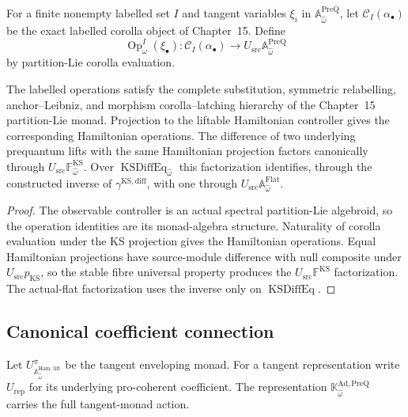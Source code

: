 \begin{construction}
\label{constr:prequantum-exact-labelled-observable-operations}
For a finite nonempty labelled set $I$ and tangent variables $\xi_i$ in
$\mathbb A_{\widehat\omega}^{\mathrm{PreQ}}$, let
$\mathcal C_I(\alpha_\bullet)$ be the exact labelled corolla object of Chapter~15.
Define
\[
\boxed{
\operatorname{Op}^{I}_{\widehat\omega}(\xi_\bullet):
\mathcal C_I(\alpha_\bullet)
\longrightarrow
U_{\mathrm{src}}\mathbb A_{\widehat\omega}^{\mathrm{PreQ}}
}
\]
by partition-Lie corolla evaluation.
\end{construction}

\begin{theorem}
\label{thm:prequantum-complete-higher-observable-coherence}
The labelled operations satisfy the complete substitution, symmetric relabelling,
anchor--Leibniz, and morphism corolla--latching hierarchy of the Chapter~15
partition-Lie monad.  Projection to the liftable Hamiltonian controller gives the
corresponding Hamiltonian operations.  The difference of two underlying
prequantum lifts with the same Hamiltonian projection factors canonically through
$U_{\mathrm{src}}\mathbb F_{\widehat\omega}^{\mathrm{KS}}$.  Over
$\operatorname{KSDiffEq}_{\widehat\omega}$ this factorization identifies, through
the constructed inverse of $\gamma^{\mathrm{KS,diff}}$, with one through
$U_{\mathrm{src}}\mathbb A_{\widehat\omega}^{\mathrm{Flat}}$.
\end{theorem}

\begin{proof}
The observable controller is an actual spectral partition-Lie algebroid, so the
operation identities are its monad-algebra structure.  Naturality of corolla
evaluation under the KS projection gives the Hamiltonian operations.  Equal
Hamiltonian projections have source-module difference with null composite under
$U_{\mathrm{src}}p_{\mathrm{KS}}$, so the stable fibre universal property
produces the $U_{\mathrm{src}}\mathbb F^{\mathrm{KS}}$ factorization.  The
actual-flat factorization uses the inverse only on $\operatorname{KSDiffEq}$.
\end{proof}

\subsection{Canonical coefficient connection}
\label{sec:prequantum-atiyah-spencer-connection}

Let $U^\pi_{\mathbb A_{\widehat\omega}^{\mathrm{Ham,\,lift}}}$ be the tangent
enveloping monad.  For a tangent representation write $U_{\mathrm{rep}}$ for its
underlying pro-coherent coefficient.  The representation
$\mathbb K_{\widehat\omega}^{\mathrm{Ad,PreQ}}$ carries the full tangent-monad
action.

